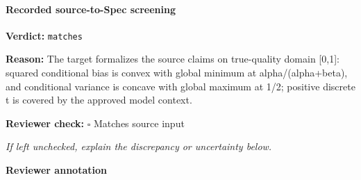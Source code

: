 \documentclass[10pt]{article}
\newcommand{\reviewerbox}{%
  \par\noindent\fbox{\parbox{0.96\linewidth}{\rule{0pt}{0.38in}}}\par
}
\newcommand{\reviewmatch}[1]{%
  \par\noindent\textbf{Reviewer check:} $\square$\; #1\par
  \noindent\emph{If left unchecked, explain the discrepancy or uncertainty below.}\par
}
\begin{document}
\paragraph{Recorded source-to-Spec screening}
\textbf{Verdict:} \texttt{matches}
\\
{\raggedright
\textbf{Reason:} The target formalizes the source claims on true-\allowbreak{}quality domain [0,1]:\allowbreak{} squared conditional bias is convex with global minimum at alpha/\allowbreak{}(alpha+beta), and conditional variance is concave with global maximum at 1/\allowbreak{}2;\allowbreak{} positive discrete t is covered by the approved model context.\allowbreak{}
\par}
\reviewmatch{Matches source input}
\noindent\textbf{Reviewer annotation}\par
\reviewerbox
\end{document}
